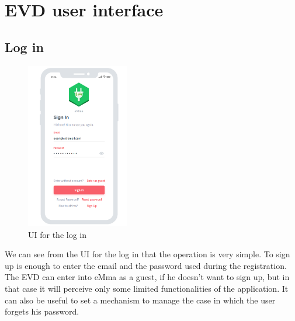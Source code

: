 \section{EVD user interface}
\subsection{Log in}
\begin{figure}[H]
    \centering
    \includegraphics[width=0.4\textwidth]{Images/cp3/logIn.png}
    \caption{UI for the log in}
\end{figure}
We can see from the UI for the log in that the operation is very simple. To sign up is enough to enter the email and the password used during the registration. The EVD can enter into eMma as a guest, if he doesn't want to sign up, but in that case it will perceive only some limited functionalities of the application. It can also be useful to set a mechanism to manage the case in which the user forgets his password.

